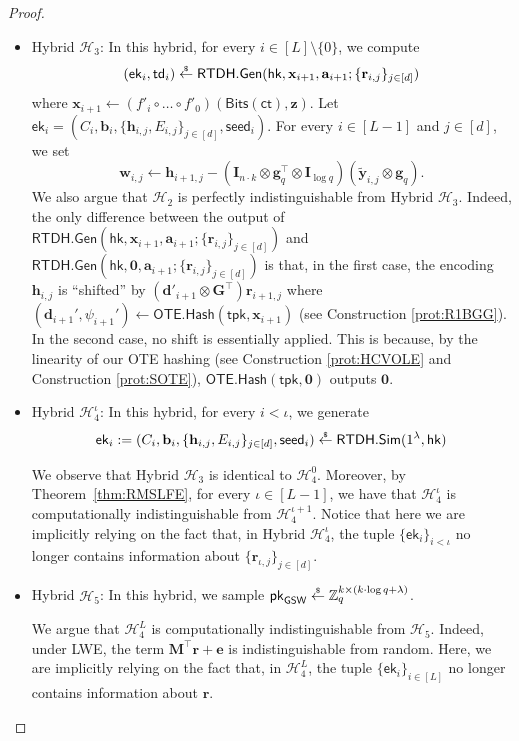 \documentclass{theoretics}
\newcommand{\ek}{\mathsf{ek}}
\newcommand{\td}{\mathsf{td}}
\newcommand{\getsr}{\overset{\raisebox{-1pt}{$\scriptscriptstyle \$$}}{\gets}}
\newcommand{\sample}{\getsr}
\newcommand{\OTE}{\mathsf{OTE}}
\newcommand{\Z}{\mathbb{Z}}
\renewcommand{\sec}{\ensuremath{\lambda}}
\newcommand{\ct}{\mathsf{ct}}
\newcommand{\Sim}{\mathsf{Sim}}
\newcommand{\RTDH}{\mathsf{RTDH}}
\newcommand{\BV}{\mathsf{GSW}}
\newcommand{\algofont}[1]{\ensuremath{\mathsf{#1}}}
\newcommand{\tpk}{{\algofont{tpk}}}
\newcommand{\Gen}{{\algofont{Gen}}}
\newcommand{\Hash}{{\algofont{Hash}}}
\newcommand{\id}{\ensuremath{\mathbf{I}}}
\newcommand{\pk}{{\mathsf{pk}}}
\newcommand{\hk}{\ensuremath{\mathsf{hk}}}
\newcommand{\thmref}[1]{Theorem~\ref{thm:#1}}
\newcommand\bbbone{1}
\begin{document}
\begin{proof}
\begin{itemize}
\item Hybrid ${\mathcal{H}_3}$: In this hybrid, for every $i\in[L]\setminus\{0\}$, we compute
\[(\ek_i, \td_i)\sample\RTDH.\Gen(\hk, \mathbf{x}_{i+1}, \mathbf{a}_{i+1}; \{\mathbf{r}_{i, j}\}_{j\in[d]})\]
where $\mathbf{x}_{i+1}\gets (f'_i\circ \dots\circ f'_0)(\mathsf{Bits}(\ct), \mathbf{z})$. Let $\ek_i=(C_i, \mathbf{b}_i, \{\mathbf{h}_{i, j}, E_{i, j}\}_{j\in[d]}, \mathsf{seed}_i)$. For every $i\in[L-1]$ and $j\in[d]$, we set
\[ \mathbf{w}_{i,j}\gets \mathbf{h}_{i+1,j} -(\id_{n\cdot k}\otimes \mathbf g_q^\intercal\otimes \id_{\log q})(\tilde{\mathbf{y}}_{i,j}\otimes \mathbf g_q). \]
We also argue that ${\mathcal{H}_2}$ is perfectly indistinguishable from Hybrid ${\mathcal{H}_3}$. Indeed, the only difference between the output of $\RTDH.\Gen(\hk, \allowbreak\mathbf{x}_{i+1}, \allowbreak\mathbf{a}_{i+1}; \allowbreak\{\mathbf{r}_{i, j}\}_{j\in[d]})$ and $\RTDH.\Gen(\hk, \allowbreak\mathbf{0}, \allowbreak\mathbf{a}_{i+1}; \allowbreak\{\mathbf{r}_{i, j}\}_{j\in[d]})$
is that, in the first case, the encoding $\mathbf{h}_{i, j}$ is ``shifted'' by $(\mathbf d'_{i+1}\otimes \mathbf G^\intercal)\mathbf r_{i+1,j}$ where $(\mathbf{d}_{i+1}', \psi_{i+1}')\gets \OTE.\Hash(\tpk, \mathbf{x}_{i+1})$ (see Construction \ref{prot:R1BGG}). In the second case, no shift is essentially applied. This is because, by the linearity of our OTE hashing (see Construction \ref{prot:HCVOLE} and Construction \ref{prot:SOTE}), $\OTE.\Hash(\tpk, \mathbf{0})$ outputs $\mathbf{0}$.

\item Hybrid ${\mathcal{H}_4^\iota}$: In this hybrid, for every $i<\iota$, we generate
\[\ek_i:=(C_i, \mathbf{b}_i, \{\mathbf{h}_{i, j}, E_{i, j}\}_{j\in[d]}, \mathsf{seed}_i)\sample\RTDH.\Sim(\bbbone^\sec, \hk)\]


We observe that Hybrid ${\mathcal{H}_3}$ is identical to ${\mathcal{H}_4^0}$. Moreover, by \thmref{RMSLFE}, for every $\iota\in[L-1]$, we have that ${\mathcal{H}_4^\iota}$ is computationally indistinguishable from ${\mathcal{H}_4^{\iota+1}}$. Notice that here we are implicitly relying on the fact that, in Hybrid ${\mathcal{H}_4^\iota}$, the tuple
$\{\ek_i\}_{i<\iota}$ no longer contains information about $\{\mathbf{r}_{\iota, j}\}_{j\in[d]}$.

\item Hybrid ${\mathcal{H}_5}$: In this hybrid, we sample $\pk_\BV\sample\Z_q^{k\times (k\cdot \log q+\sec)}$.


We argue that ${\mathcal{H}_4^L}$ is computationally indistinguishable from ${\mathcal{H}_5}$. Indeed, under LWE, the term $\mathbf{M}^\intercal\mathbf r+\mathbf e$ is indistinguishable from random. Here, we are implicitly relying on the fact that, in ${\mathcal{H}_4^L}$, the tuple $\{\ek_i\}_{i\in[L]}$ no longer contains information about $\mathbf{r}$.


\end{itemize}
\end{proof}
\end{document}
